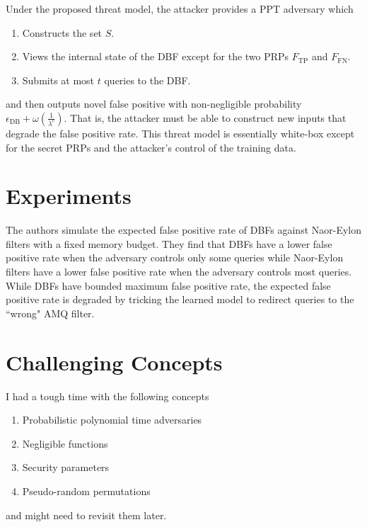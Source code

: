 \documentclass{article}
\begin{document}
Under the proposed threat model, the attacker provides a PPT adversary which
\begin{enumerate}
    \item Constructs the set $S$.
    \item Views the internal state of the DBF except for the two PRPs $F_\text{TP}$ and $F_\text{FN}$.
    \item Submits at most $t$ queries to the DBF.
\end{enumerate}
and then outputs novel false positive with non-negligible probability $\epsilon_\text{DB} + \omega\left(\frac{1}{\lambda^c}\right)$. That is, the attacker must be able to construct new inputs that degrade the false positive rate. This threat model is essentially white-box except for the secret PRPs and the attacker's control of the training data.

\section{Experiments}

The authors simulate the expected false positive rate of DBFs against Naor-Eylon filters with a fixed memory budget. They find that DBFs have a lower false positive rate when the adversary controls only some queries while Naor-Eylon filters have a lower false positive rate when the adversary controls most queries. While DBFs have bounded maximum false positive rate, the expected false positive rate is degraded by tricking the learned model to redirect queries to the ``wrong" AMQ filter.

\section{Challenging Concepts}

I had a tough time with the following concepts
\begin{enumerate}
    \item Probabilistic polynomial time adversaries
    \item Negligible functions
    \item Security parameters
    \item Pseudo-random permutations
\end{enumerate}
and might need to revisit them later. 

\printbibliography
\end{document}
